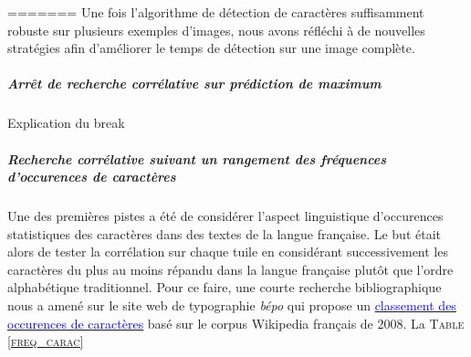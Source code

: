 \documentclass[a4paper,12pt,titlepage]{report}
\begin{document}
=======
	Une fois l'algorithme de détection de caractères suffisamment robuste sur plusieurs exemples d'images, nous avons réfléchi à de nouvelles stratégies afin d'améliorer le temps de détection sur une image complète.
	\subparagraph{Arrêt de recherche corrélative sur prédiction de maximum}
	Explication du break
	\subparagraph{Recherche corrélative suivant un rangement des fréquences d'occurences de caractères}	 
	 Une des premières pistes a été de considérer l'aspect linguistique d'occurences statistiques des caractères dans des textes de la langue française. Le but était alors de tester la corrélation sur chaque tuile en considérant successivement les caractères du plus au moins répandu dans la langue française plutôt que l'ordre alphabétique traditionnel. Pour ce faire, une courte recherche bibliographique nous a amené sur le site web de typographie \textit{bépo} qui propose un \href{http://bepo.fr/wiki/Fr%C3%A9quence_des_caract%C3%A8res}{\textcolor{blue}{classement des occurences de caractères}} basé sur le corpus Wikipedia français de 2008. La \textsc{Table \ref{freq_carac}} 
\end{document}
